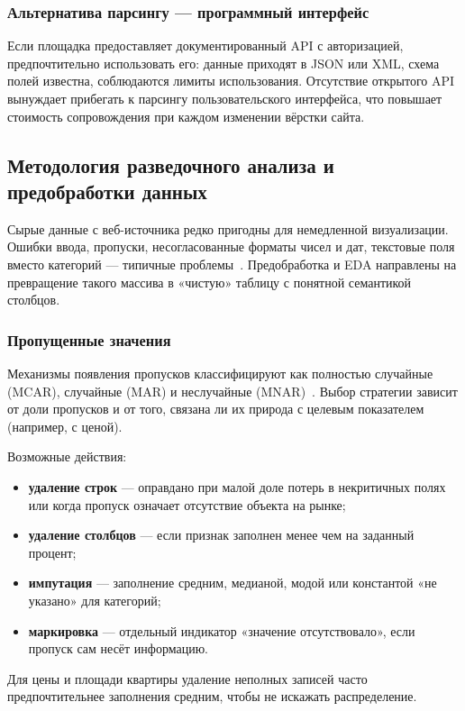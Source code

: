 \subsubsection{Альтернатива парсингу --- программный интерфейс}

Если площадка предоставляет документированный API с авторизацией, предпочтительно использовать его: данные приходят в JSON или XML, схема полей известна, соблюдаются лимиты использования. Отсутствие открытого API вынуждает прибегать к парсингу пользовательского интерфейса, что повышает стоимость сопровождения при каждом изменении вёрстки сайта.

\subsection{Методология разведочного анализа и предобработки данных}

Сырые данные с веб-источника редко пригодны для немедленной визуализации. Ошибки ввода, пропуски, несогласованные форматы чисел и дат, текстовые поля вместо категорий --- типичные проблемы~\cite{mckinney2023}. Предобработка и EDA направлены на превращение такого массива в «чистую» таблицу с понятной семантикой столбцов.

\subsubsection{Пропущенные значения}

Механизмы появления пропусков классифицируют как полностью случайные (MCAR), случайные (MAR) и неслучайные (MNAR)~\cite{demidova2022}. Выбор стратегии зависит от доли пропусков и от того, связана ли их природа с целевым показателем (например, с ценой).

Возможные действия:
\begin{itemize}
    \item \textbf{удаление строк} --- оправдано при малой доле потерь в некритичных полях или когда пропуск означает отсутствие объекта на рынке;
    \item \textbf{удаление столбцов} --- если признак заполнен менее чем на заданный процент;
    \item \textbf{импутация} --- заполнение средним, медианой, модой или константой «не указано» для категорий;
    \item \textbf{маркировка} --- отдельный индикатор «значение отсутствовало», если пропуск сам несёт информацию.
\end{itemize}
Для цены и площади квартиры удаление неполных записей часто предпочтительнее заполнения средним, чтобы не искажать распределение.

